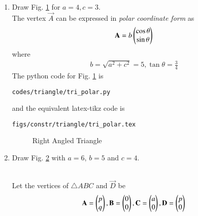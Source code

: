 \begin{enumerate}[label=\thesubsection.\arabic*.,ref=\thesubsection.\theenumi]
\item Draw Fig. \ref{fig:tri_polar} for $a = 4, c =3$.
\label{const:tri_polar}
%
\\
\solution 
 The vertex  $\vec{A}$ can  be expressed  in {\em polar coordinate form} as
%
\begin{align}
\mathbf{A} = b\begin{pmatrix}\cos \theta\\  \sin \theta\end{pmatrix} 
\end{align}
%
where
\begin{align}
b = \sqrt{a^2+c^2} = 5, \tan \theta = \frac{3}{4}
\end{align}
%
The python code for  Fig. \ref{fig:tri_polar} is
\begin{lstlisting}
codes/triangle/tri_polar.py
\end{lstlisting}
%
and the equivalent latex-tikz code is
%
\begin{lstlisting}
figs/constr/triangle/tri_polar.tex
\end{lstlisting}
\begin{figure}[!ht]
\centering
\resizebox{\columnwidth}{!}{}
\caption{Right Angled Triangle}
\label{fig:tri_polar}	
\end{figure}
%
\item Draw Fig. \ref{fig:tri_sss} with $a=6$, $b=5$  and $c=4$.  
\label{const:tri_sss}
\begin{figure}[!ht]
	\begin{center}
			\resizebox{\columnwidth}{!}{}
	\end{center}
	\caption{}
	\label{fig:tri_sss}	
\end{figure}
\\
\solution Let the vertices of  $\triangle ABC$ and $\vec{D}$ be 
\begin{align}
\label{eq:tri_basic}
\mathbf{A} = \begin{pmatrix}p\\q\end{pmatrix}, \mathbf{B} = \begin{pmatrix}0\\0\end{pmatrix}, \mathbf{C} = \begin{pmatrix}a\\0\end{pmatrix}, \mathbf{D} = \begin{pmatrix}p\\0\end{pmatrix}
\end{align}
%


\end{enumerate}
